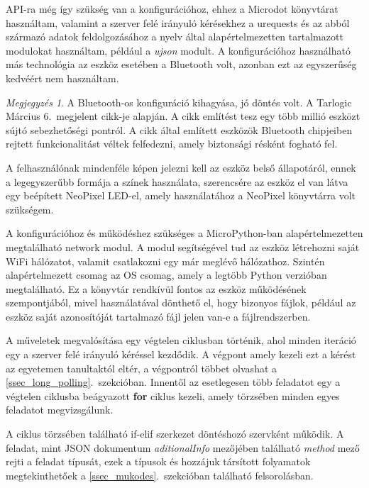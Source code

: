 \documentclass{thesis-ekf}
\theoremstyle{definition}
\theoremstyle{remark}
\newtheorem{megjegyzes}{Megjegyzés}
\begin{document}
	 API-ra még így szükség van a konfigurációhoz, ehhez a Microdot könyvtárat használtam, valamint a szerver felé irányuló kérésekhez a urequests és az abból származó adatok feldolgozásához a nyelv által alapértelmezetten tartalmazott modulokat használtam, például a \textit{ujson} modult. A konfigurációhoz használható más technológia az eszköz esetében a Bluetooth volt, azonban ezt az egyszerűség kedvéért nem használtam.
	 
	 \begin{megjegyzes}
	 	A Bluetooth-os konfiguráció kihagyása, jó döntés volt. A Tarlogic Március 6.~megjelent cikk-je alapján\cite{bib_esp_bluetooth}. A cikk említést tesz egy több millió eszközt sújtó sebezhetőségi pontról. A cikk által említett eszközök Bluetooth chipjeiben rejtett funkcionalitást véltek felfedezni, amely biztonsági résként fogható fel.
	 \end{megjegyzes}
	 
	 A felhasználónak mindenféle képen jelezni kell az eszköz belső állapotáról, ennek a legegyszerűbb formája a színek használata, szerencsére az eszköz el van látva egy  beépített NeoPixel LED-el, amely használatához a NeoPixel könyvtárra volt szükségem.
	 
	 A konfigurációhoz és működéshez szükséges a MicroPython-ban alapértelmezetten megtalálható network modul. A modul segítségével tud az eszköz létrehozni saját WiFi hálózatot, valamit csatlakozni egy már meglévő hálózathoz. Szintén alapértelmezett csomag az OS csomag, amely a legtöbb Python verzióban megtalálható. Ez a könyvtár rendkívül fontos az eszköz működésének szempontjából, mivel használatával dönthető el, hogy bizonyos fájlok, például az eszköz saját azonosítóját tartalmazó fájl jelen van-e a fájlrendszerben.
	 
	 A műveletek megvalósítása egy végtelen ciklusban történik, ahol minden iteráció egy a szerver felé irányuló kéréssel kezdődik. A végpont amely kezeli ezt a kérést az egyetemen tanultaktól eltér, a végpontról többet olvashat a \ref{ssec_long_polling}.~szekcióban. Innentől az esetlegesen több feladatot egy a végtelen ciklusba beágyazott \textbf{for} ciklus kezeli, amely törzsében minden egyes feladatot megvizsgálunk.
	 
	 A ciklus törzsében található if-elif szerkezet döntéshozó szervként működik. A feladat, mint JSON dokumentum \textit{aditionalInfo} mezőjében található \textit{method} mező rejti a feladat típusát, ezek a típusok és hozzájuk társított folyamatok megtekinthetőek a \ref{ssec_mukodes}.~szekcióban található felsorolásban.
	 
\end{document}
